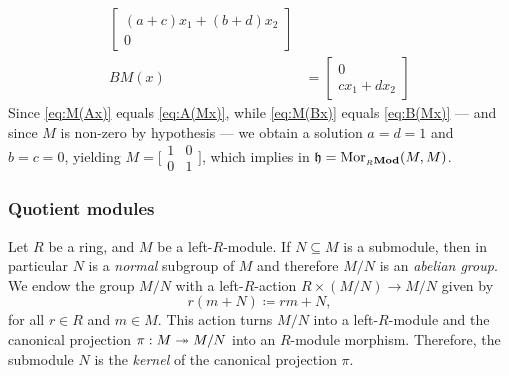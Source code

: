 \begin{example}
\begin{align}
  \begin{bmatrix}
    (a + c) x_1 + (b + d) x_2 \\
    0
  \end{bmatrix}
  \\ %
  \label{eq:B(Mx)}
  B M(x) &=
  \begin{bmatrix}
    0 \\
    c x_1 + d x_2
  \end{bmatrix}
\end{align}
Since \cref{eq:M(Ax)} equals \cref{eq:A(Mx)}, while \cref{eq:M(Bx)} equals
\cref{eq:B(Mx)} --- and since \(M\) is non-zero by hypothesis --- we obtain a
solution \(a = d = 1\) and \(b = c = 0\), yielding
\(M = \big[
\begin{smallmatrix}
  1 & 0 \\
  0 & 1
\end{smallmatrix}
\big]\), which implies in \(\mathfrak{h} = \operatorname{Mor}_{{{}_{R}\textbf{Mod}}}(M, M)\).
\end{example}

\subsubsection{Quotient modules}

\begin{definition}
\label{def:quotient-module}
Let \(R\) be a ring, and \(M\) be a left-\(R\)-module. If \(N \subseteq M\) is a
submodule, then in particular \(N\) is a \emph{normal} subgroup of \(M\) and
therefore \(M/N\) is an \emph{abelian group}. We endow the group \(M/N\) with a
left-\(R\)-action \(R \times (M/N) \to M/N\) given by
\[
r (m + N) \coloneq r m + N,
\]
for all \(r \in R\) and \(m \in M\). This action turns \(M/N\) into a
left-\(R\)-module and the canonical projection \(\pi: M \twoheadrightarrow M/N\) into an
\(R\)-module morphism. Therefore, the submodule \(N\) is the \emph{kernel} of
the canonical projection \(\pi\).
\end{definition}

